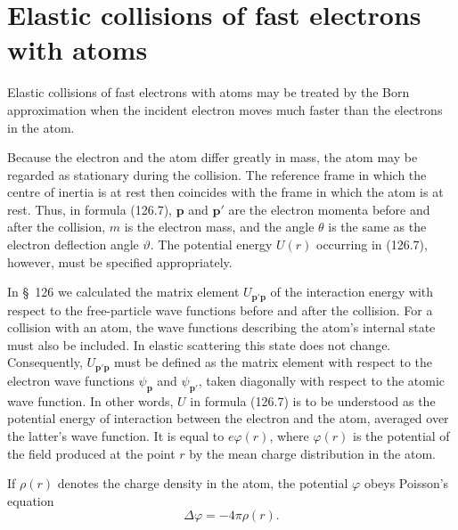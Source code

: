 \section{Elastic collisions of fast electrons with atoms}

Elastic collisions of fast electrons with atoms may be treated by the Born approximation when the incident electron moves much faster than the electrons in the atom.

Because the electron and the atom differ greatly in mass, the atom may be regarded as stationary during the collision. The reference frame in which the centre of inertia is at rest then coincides with the frame in which the atom is at rest. Thus, in formula (126.7), $\mathbf p$ and $\mathbf p'$ are the electron momenta before and after the collision, $m$ is the electron mass, and the angle $\theta$ is the same as the electron deflection angle $\vartheta$. The potential energy $U(r)$ occurring in (126.7), however, must be specified appropriately.

In \S~126 we calculated the matrix element $U_{\mathbf p'\mathbf p}$ of the interaction energy with respect to the free-particle wave functions before and after the collision. For a collision with an atom, the wave functions describing the atom's internal state must also be included. In elastic scattering this state does not change. Consequently, $U_{\mathbf p'\mathbf p}$ must be defined as the matrix element with respect to the electron wave functions $\psi_{\mathbf p}$ and $\psi_{\mathbf p'}$, taken diagonally with respect to the atomic wave function. In other words, $U$ in formula (126.7) is to be understood as the potential energy of interaction between the electron and the atom, averaged over the latter's wave function. It is equal to $e\varphi(r)$, where $\varphi(r)$ is the potential of the field produced at the point $r$ by the mean charge distribution in the atom.

If $\rho(r)$ denotes the charge density in the atom, the potential $\varphi$ obeys Poisson's equation
\[
 \Delta\varphi=-4\pi\rho(r).
\]

